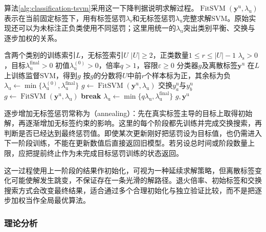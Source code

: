 算法\ref{alg:classification-tsvm}采用这一下降判据说明求解过程。$\operatorname{FitSVM}(\bm{y}^{\mathrm{u}},\lambda_{\mathrm{u}})$表示在当前固定标签下，用有标签惩罚$\lambda_{\mathrm{s}}$和无标签惩罚$\lambda_{\mathrm{u}}$完整求解SVM。原始实现还可以为未标注正负类使用不同惩罚；这里用统一的$\lambda_{\mathrm{u}}$突出类别平衡、交换与逐步加权的关系。

\begin{algorithm}[固定类别数量的TSVM逐步加权]
  \label{alg:classification-tsvm}
  \begin{algorithmic}[1]
    \Require 含两个类别的训练索引$L$，无标签索引$U$
    \Require $|U|\geq2$，正类数量$1\leq r\leq|U|-1$
    \Require $\lambda_{\mathrm{s}}>0$，目标$\lambda_{\mathrm{u}}^{\mathrm{final}}>0$
    \Require 初值$\lambda_{\mathrm{u}}^{(0)}>0$，倍率$q>1$，容限$\varepsilon\geq0$
    \Ensure 分类器$g$及离散标签$\bm{y}^{\mathrm{u}}$
    \State 在$L$上训练监督SVM，得到$g$
    \State 按$g$的分数将$U$中前$r$个样本标为正，其余标为负
    \State $\lambda_{\mathrm{u}}\gets
      \min\{\lambda_{\mathrm{u}}^{(0)},\lambda_{\mathrm{u}}^{\mathrm{final}}\}$
      \State $g\gets\operatorname{FitSVM}(\bm{y}^{\mathrm{u}},\lambda_{\mathrm{u}})$
        \State 交换$y_a^{\mathrm{u}}$与$y_b^{\mathrm{u}}$
        \State $g\gets\operatorname{FitSVM}(\bm{y}^{\mathrm{u}},\lambda_{\mathrm{u}})$
      \EndWhile
        \State \textbf{break}
      \EndIf
      \State $\lambda_{\mathrm{u}}\gets
        \min\{q\lambda_{\mathrm{u}},\lambda_{\mathrm{u}}^{\mathrm{final}}\}$
    \EndWhile
    \State \Return $g,\bm{y}^{\mathrm{u}}$
  \end{algorithmic}
\end{algorithm}

逐步增加无标签惩罚常称为（annealing）：先在真实标签主导的目标上取得初始解，再逐渐增加无标签约束的影响。这里的每个阶段都先训练并完成交换搜索，再判断是否已经达到最终惩罚值。即使某次更新刚好把惩罚设为目标值，也仍需进入下一阶段训练，不能在更新数值后直接返回旧模型。若另设总时间或阶段数量上限，应把提前终止作为未完成目标惩罚训练的状态返回。

这一过程使用上一阶段的结果作初始化，可视为一种延续求解策略，但离散标签变化可能使解发生跳变，不保证存在一条光滑的解路径。退火倍率、初始标签和交换搜索方式会改变最终结果，适合通过多个合理初始化与独立验证比较，而不是把逐步加权当作全局最优算法。

\subsubsection{理论分析}
\label{sec:classification-tsvm-analysis}

